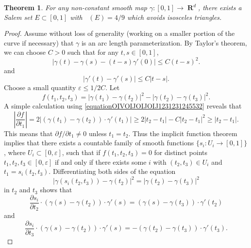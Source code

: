 \documentclass[dvipsnames,letterpaper,12pt]{article}
\numberwithin{equation}{section}
\DeclareMathOperator{\fordim}{\dim_{\mathbf{F}}}
\DeclareMathOperator{\RR}{\mathbf{R}}
\newtheorem{theorem}{Theorem}
\numberwithin{theorem}{section}
\begin{document}
\begin{theorem}
    For any non-constant smooth map $\gamma: [0,1] \to \RR^d$, there exists a Salem set $E \subset [0,1]$ with $\fordim(E) = 4/9$ which avoids isosceles triangles.
\end{theorem}
\begin{proof}
    Assume without loss of generality (working on a smaller portion of the curve if necessary) that $\gamma$ is an arc length parameterization. By Taylor's theorem, we can choose $C > 0$ such that for any $t,s \in [0,1]$,
    \begin{equation} \label{equationOIVOIJOIJOIJ1231231245532}
        |\gamma(t) - \gamma(s) - (t - s)\gamma'(0)| \leq C (t - s)^2.
    \end{equation}
    and
    \begin{equation} \label{equationCIOJAOIVJVOIJioj1312421541}
        |\gamma'(t) - \gamma'(s)| \leq C |t - s|.
    \end{equation}
    Choose a small quantity $\varepsilon \leq 1/2C$. Let
    \begin{equation}
        f(t_1,t_2,t_3) = |\gamma(t_1) - \gamma(t_2)|^2 - |\gamma(t_2) - \gamma(t_3)|^2.
    \end{equation}
    A simple calculation using \eqref{equationOIVOIJOIJOIJ1231231245532} reveals that
    \begin{equation} \label{equationCOIJAWOIJCAWOIJWOAI2112412}
        \left| \frac{\partial f}{\partial t_1} \right| = 2 \left| (\gamma(t_1) - \gamma(t_2)) \cdot \gamma'(t_1) \right| \geq 2|t_2 - t_1| - C |t_2 - t_1|^2 \geq |t_2 - t_1|.
    \end{equation}
    This means that $\partial f / \partial t_1 \neq 0$ unless $t_1 = t_2$. Thus the implicit function theorem implies that there exists a countable family of smooth functions $\{ s_i: U_i \to [0,1] \}$, where $U_i \subset [0,\varepsilon]$, such that if $f(t_1,t_2,t_3) = 0$ for distinct points $t_1,t_2,t_3 \in [0,\varepsilon]$ if and only if there exists some $i$ with $(t_2,t_3) \in U_i$ and $t_1 = s_i(t_2,t_3)$. Differentiating both sides of the equation
    \[ |\gamma(s_i(t_2,t_3)) - \gamma(t_2)|^2 = |\gamma(t_2) - \gamma(t_3)|^2 \]
    in $t_2$ and $t_3$ shows that
    \[ \frac{\partial s_i}{\partial t_2} \cdot (\gamma(s) - \gamma(t_2)) \cdot \gamma'(s) = (\gamma(s) - \gamma(t_3)) \cdot \gamma'(t_2) \]
    and
    \[ \frac{\partial s_i}{\partial t_3} \cdot (\gamma(s) - \gamma(t_2)) \cdot \gamma'(s) = - (\gamma(t_2) - \gamma(t_3)) \cdot \gamma'(t_3). \]

\end{proof}
\end{document}
